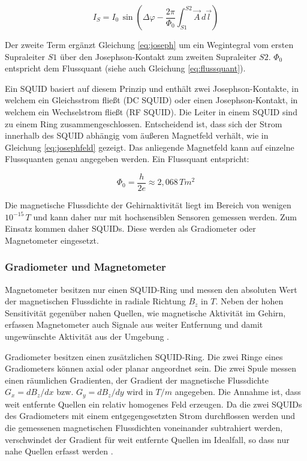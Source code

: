 \documentclass[doc,a4paper,12pt]{apa6}
\begin{document}
\begin{equation}
\label{eq:josephfeld}
I_S = I_0\,\sin{\left( \Delta \varphi - \frac{2\pi}{\Phi_0} \int_{S1}^{S2} \vec{A}\,d\vec{l} \right)}
\end{equation}

Der zweite Term ergänzt Gleichung \ref{eq:joseph} um ein Wegintegral vom ersten Supraleiter $S1$ über den Josephson-Kontakt zum zweiten Supraleiter $S2$. $\Phi_0$ entspricht dem Flussquant (siehe auch Gleichung \ref{eq:flussquant}).

Ein SQUID basiert auf diesem Prinzip und enthält zwei Josephson-Kontakte, in welchem ein Gleichsstrom fließt (DC SQUID) oder einen Josephson-Kontakt, in welchem ein Wechselstrom fließt (RF SQUID). Die Leiter in einem SQUID sind zu einem Ring zusammengeschlossen. Entscheidend ist, dass sich der Strom innerhalb des SQUID abhängig vom äußeren Magnetfeld verhält, wie in Gleichung \ref{eq:josephfeld} gezeigt. Das anliegende Magnetfeld kann auf einzelne Flussquanten genau angegeben werden. Ein Flussquant entspricht:

\begin{equation}
\label{eq:flussquant}
\Phi_0 = \frac{h}{2e} \approx 2,068\,Tm^2
\end{equation}

Die magnetische Flussdichte der Gehirnaktivität liegt im Bereich von wenigen $10^{-15}\,T$ und kann daher nur mit hochsensiblen Sensoren gemessen werden. Zum Einsatz kommen daher SQUIDs. Diese werden als Gradiometer oder Magnetometer eingesetzt.

\subsubsection{Gradiometer und Magnetometer}

Magnetometer besitzen nur einen SQUID-Ring und messen den absoluten Wert der magnetischen Flussdichte in radiale Richtung $B_z$ in $T$. Neben der hohen Sensitivität gegenüber nahen Quellen, wie magnetische Aktivität im Gehirn, erfassen Magnetometer auch Signale aus weiter Entfernung und damit ungewünschte Aktivität aus der Umgebung \parencite{hansen2010meg}.

Gradiometer besitzen einen zusätzlichen SQUID-Ring. Die zwei Ringe eines Gradiometers können axial oder planar angeordnet sein. Die zwei Spule messen einen räumlichen Gradienten, der Gradient der magnetische Flussdichte $G_x = dB_z/dx$ bzw. $G_y = dB_z/dy$ wird in $T/m$ angegeben. Die Annahme ist, dass weit entfernte Quellen ein relativ homogenes Feld erzeugen. Da die zwei SQUIDs des Gradiometers mit einem entgegengesetzten Strom durchflossen werden und die gemessenen magnetischen Flussdichten voneinander subtrahiert werden, verschwindet der Gradient für weit entfernte Quellen im Idealfall, so dass nur nahe Quellen erfasst werden \parencite{hansen2010meg}.
\end{document}
